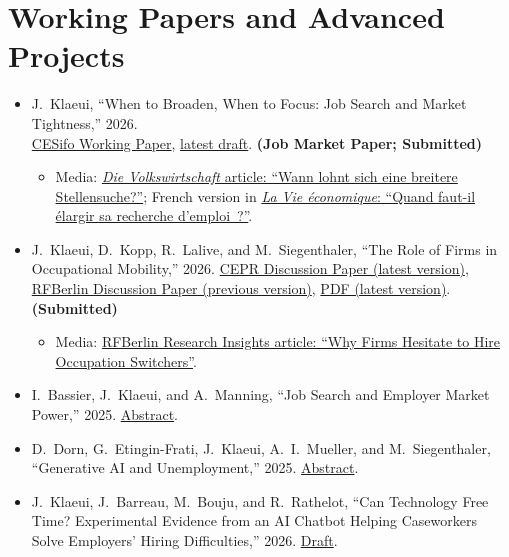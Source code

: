 \documentclass[11pt]{article}
\begin{document}
\section{Working Papers and Advanced Projects}
\begin{itemize}
\item J.~Klaeui, ``When to Broaden, When to Focus: Job Search and Market Tightness,'' 2026.\\ \href{https://www.ifo.de/DocDL/cesifo1_wp12744.pdf}{CESifo Working Paper}, \href{https://jklaeui.github.io/download/jmp_klaeui.pdf}{latest draft}. \textbf{(Job Market Paper; Submitted)}
  \begin{itemize}[label=--]
  \item Media: \href{https://dievolkswirtschaft.ch/de/2026/09/wann-lohnt-sich-eine-breitere-stellensuche/}{\textit{Die Volkswirtschaft} article: ``Wann lohnt sich eine breitere Stellensuche?''}; French version in \href{https://dievolkswirtschaft.ch/fr/2026/09/quand-faut-il-elargir-sa-recherche-demploi/}{\textit{La Vie \'economique}: ``Quand faut-il \'elargir sa recherche d'emploi~?''}.
  \end{itemize}
\item J.~Klaeui, D.~Kopp, R.~Lalive, and M.~Siegenthaler, ``The Role of Firms in Occupational Mobility,'' 2026. \href{https://cepr.org/publications/dp21027}{CEPR Discussion Paper (latest version)}, \href{https://www.rfberlin.com/wp-content/uploads/2026/01/26020.pdf}{RFBerlin Discussion Paper (previous version)}, \href{https://jklaeui.github.io/download/klaeui_kopp_lalive_siegenthaler_role_of_firms_occ_mobility.pdf}{PDF (latest version)}. \textbf{(Submitted)}
  \begin{itemize}[label=--]
  \item Media: \href{https://www.rfberlin.com/research-insights/why-firms-hesitate-to-hire-occupation-switchers/}{RFBerlin Research Insights article: ``Why Firms Hesitate to Hire Occupation Switchers''}.
  \end{itemize}
\item I.~Bassier, J.~Klaeui, and A.~Manning, ``Job Search and Employer Market Power,'' 2025. \hyperlink{abs:power}{Abstract}.
\item D.~Dorn, G.~Etingin-Frati, J.~Klaeui, A.~I.~Mueller, and M.~Siegenthaler, ``Generative AI and Unemployment,'' 2025. \hyperlink{abs:genai}{Abstract}.
\item J.~Klaeui, J.~Barreau, M.~Bouju, and R.~Rathelot, ``Can Technology Free Time? Experimental Evidence from an AI Chatbot Helping Caseworkers Solve Employers' Hiring Difficulties,'' 2026. \href{https://jklaeui.github.io/download/MatchFT.pdf}{Draft}.
\end{itemize}
\end{document}
